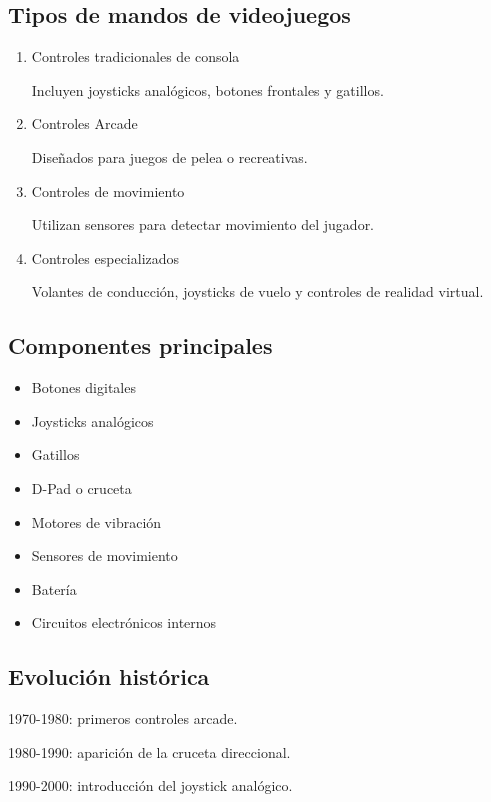 \documentclass[12pt, letterpaper]{article}
\begin{document}
\subsection{Tipos de mandos de videojuegos}

\begin{enumerate}
\item Controles tradicionales de consola

Incluyen joysticks analógicos, botones frontales y gatillos.

\item Controles Arcade

Diseñados para juegos de pelea o recreativas.

\item Controles de movimiento

Utilizan sensores para detectar movimiento del jugador.

\item Controles especializados

Volantes de conducción, joysticks de vuelo y controles de realidad virtual.
\end{enumerate}

\subsection{Componentes principales}

\begin{itemize}
\item Botones digitales
\item Joysticks analógicos
\item Gatillos
\item D-Pad o cruceta
\item Motores de vibración
\item Sensores de movimiento
\item Batería
\item Circuitos electrónicos internos
\end{itemize}

\subsection{Evolución histórica}

1970-1980: primeros controles arcade.

1980-1990: aparición de la cruceta direccional.

1990-2000: introducción del joystick analógico.
\end{document}

